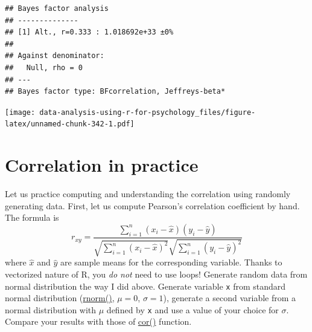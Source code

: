 \documentclass[
]{book}
\newenvironment{Shaded}{\begin{snugshade}}{\end{snugshade}}
\newcommand{\AttributeTok}[1]{\textcolor[rgb]{0.77,0.63,0.00}{#1}}
\newcommand{\ConstantTok}[1]{\textcolor[rgb]{0.00,0.00,0.00}{#1}}
\newcommand{\DecValTok}[1]{\textcolor[rgb]{0.00,0.00,0.81}{#1}}
\newcommand{\FunctionTok}[1]{\textcolor[rgb]{0.00,0.00,0.00}{#1}}
\newcommand{\NormalTok}[1]{#1}
\newcommand{\OtherTok}[1]{\textcolor[rgb]{0.56,0.35,0.01}{#1}}
\newcommand{\SpecialCharTok}[1]{\textcolor[rgb]{0.00,0.00,0.00}{#1}}
\newcommand{\StringTok}[1]{\textcolor[rgb]{0.31,0.60,0.02}{#1}}
\begin{document}
\begin{verbatim}
## Bayes factor analysis
## --------------
## [1] Alt., r=0.333 : 1.018692e+33 ±0%
## 
## Against denominator:
##   Null, rho = 0 
## ---
## Bayes factor type: BFcorrelation, Jeffreys-beta*
\end{verbatim}

\begin{Shaded}
\end{Shaded}

\texttt{[image: data-analysis-using-r-for-psychology\_files/figure-latex/unnamed-chunk-342-1.pdf]}

\hypertarget{correlation-in-practice}{%
\section{Correlation in practice}\label{correlation-in-practice}}

Let us practice computing and understanding the correlation using randomly generating data. First, let us compute Pearson's correlation coefficient by hand. The formula is
\[
r_{xy} = \frac{\sum_{i=1}^{n}(x_i-\hat{x})(y_i-\hat{y})}{\sqrt{\sum_{i=1}^{n}(x_i-\hat{x})^2}\sqrt{\sum_{i=1}^{n}(y_i-\hat{y})^2}}
\]
where \(\hat{x}\) and \(\hat{y}\) are sample means for the corresponding variable. Thanks to vectorized nature of R, you \emph{do not} need to use loops! Generate random data from normal distribution the way I did above. Generate variable \texttt{x} from standard normal distribution (\href{https://stat.ethz.ch/R-manual/R-devel/library/stats/html/Normal.html}{rnorm()}, \(\mu=0\), \(\sigma=1\)), generate a second variable from a normal distribution with \(\mu\) defined by \texttt{x} and use a value of your choice for \(\sigma\). Compare your results with those of \href{https://stat.ethz.ch/R-manual/R-devel/library/stats/html/cor.html}{cor()} function.
\end{document}
